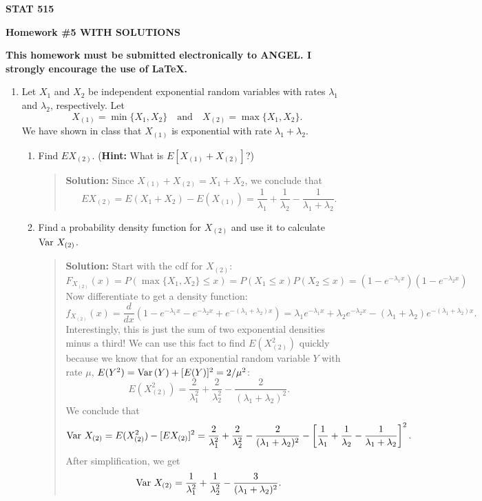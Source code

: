 \documentclass{article}
\def\Var{\mathop{\rm Var\,}\nolimits}
\begin{document}
\begin{center}
{\bf STAT 515}

{\bf Homework \#5 WITH SOLUTIONS}

{\bf This homework must be submitted electronically to ANGEL.  I strongly
encourage the use of \LaTeX.}

\end{center}

\begin{enumerate}

\item Let $X_1$ and $X_2$ be independent exponential random variables with rates
$\lambda_1$ and $\lambda_2$, respectively. Let
\[
X_{(1)} = \min\{ X_1, X_2 \} \quad\mbox{and}\quad X_{(2)} = \max\{X_1, X_2 \}.
\]
We have shown in class that $X_{(1)}$ is exponential with rate
$\lambda_1+\lambda_2$.

  \begin{enumerate}
  
  \item Find $E X_{(2)}$. ({\bf Hint:} What is $E [ X_{(1)} + X_{(2)} ]$?)
  \begin{quotation}{\bf Solution:} Since $X_{(1)}+X_{(2)}=X_1 + X_2$, we conclude that
  \[
  E X_{(2)} = E(X_1+X_2)-E(X_{(1)}) = \frac{1}{\lambda_1} + \frac{1}{\lambda_2} - 
  \frac{1}{\lambda_1+\lambda_2}.
  \]
  \end{quotation}
  
  \item Find a probability density function for $X_{(2)}$ and use it to
  calculate $\Var X_{(2)}$.
  \begin{quotation}{\bf Solution:}
  Start with the cdf for $X_{(2)}$:
  \[
  F_{X_{(2)}}(x) = P(\max\{X_1, X_2\} \le x) = P(X_1\le x)P(X_2\le x) = (1-e^{-\lambda_1 x})
  (1-e^{-\lambda_2 x})
  \]
  Now differentiate to get a density function:
  \[
  f_{X_{(2)}}(x) = \frac{d}{dx} (1 - e^{-\lambda_1 x} - e^{-\lambda_2 x} + 
  e^{-(\lambda_1+\lambda_2) x}) = 
  \lambda_1 e^{-\lambda_1 x} +
  \lambda_2 e^{-\lambda_2 x} -
  (\lambda_1+\lambda_2) e^{-(\lambda_1+\lambda_2) x}.
  \]
  Interestingly, this is just the sum of two exponential densities minus a third!  We can use this fact to 
  find $E(X_{(2)}^2)$ quickly because we know that for an exponential random variable $Y$ with
  rate $\mu$, $E(Y^2)=\Var(Y) + [E(Y)]^2 = 2/\mu^2$:
  \[
  E(X_{(2)}^2) = \frac{2}{\lambda_1^2} + \frac{2}{\lambda_2^2} - \frac{2}{(\lambda_1+\lambda_2)^2}.
  \]
  We conclude that 
  \[
  \Var X_{(2)} = E(X_{(2)}^2) - [E X_{(2)}]^2 = 
  \frac{2}{\lambda_1^2} + \frac{2}{\lambda_2^2} - \frac{2}{(\lambda_1+\lambda_2)^2} -
  \left[\frac{1}{\lambda_1} + \frac{1}{\lambda_2} - \frac{1}{\lambda_1+\lambda_2}\right]^2.
  \]
  After simplification, we get
  \[
  \Var X_{(2)} = 
  \frac{1}{\lambda_1^2} + \frac{1}{\lambda_2^2} - \frac{3}{(\lambda_1+\lambda_2)^2}.
  \]
  \end{quotation}


\end{enumerate}
\end{enumerate}
\end{document}

